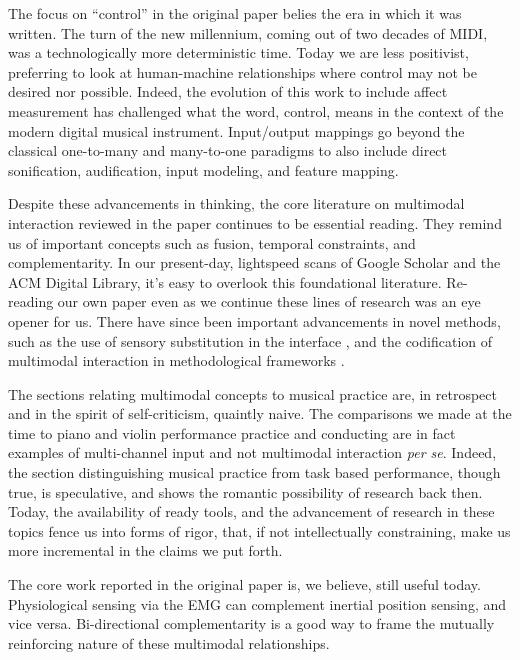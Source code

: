 The focus on ``control'' in the original paper belies the era in which it was written. The turn of the  new millennium, coming out of two decades of MIDI, was a technologically more deterministic time. Today we are less positivist, preferring to look at human-machine relationships where control may not be desired nor possible. Indeed, the evolution of this work to include affect measurement has challenged what the word, control, means in the context of the modern digital musical instrument. Input/output mappings go beyond the classical one-to-many and many-to-one paradigms to also include direct sonification, audification, input modeling, and feature mapping.

Despite these advancements in thinking, the core literature on multimodal interaction reviewed in the paper continues to be essential reading. They remind us of important concepts such as fusion, temporal constraints, and complementarity. In our present-day, lightspeed scans of Google Scholar and the ACM Digital Library, it's easy to overlook this foundational literature. Re-reading our own paper even as we continue these lines of research was an eye opener for us.  There have since been important advancements in novel methods, such as the use of sensory substitution in the interface \cite{Bach-y-Rita:2003}, and the codification of multimodal interaction in methodological frameworks \cite{Norris:2004}.

The sections relating multimodal concepts to  musical practice are, in retrospect and in the spirit of self-criticism, quaintly naive. The comparisons we made at the time to piano and violin performance practice and conducting are in fact examples of multi-channel input and not multimodal interaction \textit{per se}. Indeed, the section distinguishing musical practice from task based performance, though true, is speculative, and shows the romantic possibility of research back then. Today, the availability of ready tools, and the advancement of research in these topics fence us into forms of rigor, that, if not intellectually constraining, make us more incremental in the claims we put forth.

The core work reported in the original paper is, we believe, still useful today. Physiological sensing via the EMG can complement inertial position sensing, and vice versa. Bi-directional complementarity is a good way to frame the mutually reinforcing nature of these multimodal relationships.

